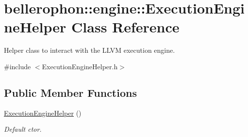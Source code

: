 \hypertarget{classbellerophon_1_1engine_1_1ExecutionEngineHelper}{}\section{bellerophon\+:\+:engine\+:\+:Execution\+Engine\+Helper Class Reference}
\label{classbellerophon_1_1engine_1_1ExecutionEngineHelper}


Helper class to interact with the L\+L\+VM execution engine.  




{\ttfamily \#include $<$Execution\+Engine\+Helper.\+h$>$}

\subsection*{Public Member Functions}
\begin{DoxyCompactItemize}
\item 
\hypertarget{classbellerophon_1_1engine_1_1ExecutionEngineHelper_acda31a25becaba3afd19312f43df054d}{}\label{classbellerophon_1_1engine_1_1ExecutionEngineHelper_acda31a25becaba3afd19312f43df054d} 
\hyperlink{classbellerophon_1_1engine_1_1ExecutionEngineHelper_acda31a25becaba3afd19312f43df054d}{Execution\+Engine\+Helper} ()
\begin{DoxyCompactList}\small\item\em Default ctor. \end{DoxyCompactList}\end{DoxyCompactItemize}
{\bf }\par
